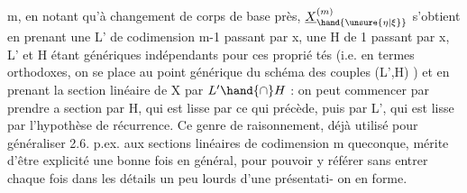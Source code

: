 
m, en notant qu'à changement de corps de base près, $\underline{X}^{(m)}_{\hand{\unsure{\eta|\xi}}}$ s'obtient en
prenant une L' de codimension m-1 passant par x, une H de 
1 passant par x, L' et H étant génériques indépendants pour ces proprié
tés (i.e. en termes orthodoxes, on se place au point générique du 
schéma des couples (L',H)  ) et en prenant la section linéaire
de X par $L'\hand{\cap} H$ : on peut commencer par prendre a section par H, qui
est lisse par ce qui précède, puis par L', qui est lisse par l'hypothèse
de récurrence. Ce genre de raisonnement, déjà utilisé pour généraliser
2.6. p.ex. aux sections linéaires de codimension m queconque, mérite
d'être explicité une bonne fois en général, pour pouvoir y référer sans
entrer  chaque fois dans les détails un peu lourds d'une présentati-%
on en forme.

